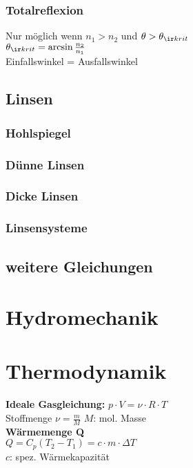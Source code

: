 \documentclass[german, 8pt]{latex4ei/latex4ei_sheet}
\begin{document}
\subsubsection{Totalreflexion}
Nur möglich wenn $n_1 > n_2$ und $\theta > \theta_{\ir krit}$ \\
$\theta_{\ir krit} = \arcsin \frac{n_2}{n_1}$\\
Einfallswinkel = Ausfallswinkel
\subsection{Linsen}
\subsubsection{Hohlspiegel}
\subsubsection{Dünne Linsen}
\subsubsection{Dicke Linsen}
\subsubsection{Linsensysteme}
\subsection{weitere Gleichungen}

\section{Hydromechanik}

\section{Thermodynamik}

\textbf{Ideale Gasgleichung:} $p \cdot V = \nu \cdot R \cdot T$ \\
Stoffmenge $\nu = \frac{m}{M}$ \qquad $M$: mol. Masse\\
\textbf{Wärmemenge Q} \\
$Q=C_p(T_2-T_1)=c \cdot m \cdot \Delta T$ \\ $c$: spez. Wärmekapazität \\
\end{document}
